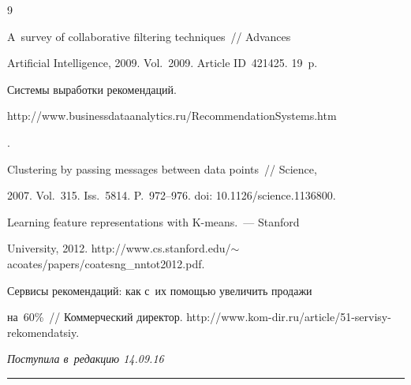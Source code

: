 {{\begin{thebibliography}{9}


 A~survey of collaborative filtering techniques~/\!\!/ Advances 


Artificial Intelligence, 2009. Vol.~2009. Article ID~421425. 19~p.




 Системы выработки рекомендаций. {\sf 


http://www.businessdataanalytics.\linebreak ru/RecommendationSystems.htm}.




 Clustering by passing messages between data points~/\!\!/ Science, 


2007. Vol.~315. Iss.~5814. P.~972--976. doi: 10.1126/science.1136800.




 Learning feature representations with K-means.~--- Stanford 


University, 2012. {\sf http://www.cs.stanford.edu/$\sim$acoates/papers/coatesng\_nntot2012.pdf}.




 Сервисы рекомендаций: как с~их помощью увеличить продажи 


на~60\%~/\!\!/ Коммерческий директор. {\sf http://www.kom-dir.ru/article/51-servisy-rekomendatsiy}.


       \end{thebibliography}


} }








\vspace*{-3pt}





\hfill{\small\textit{Поступила в~редакцию 14.09.16}}














\vspace*{9pt}





\hrule





